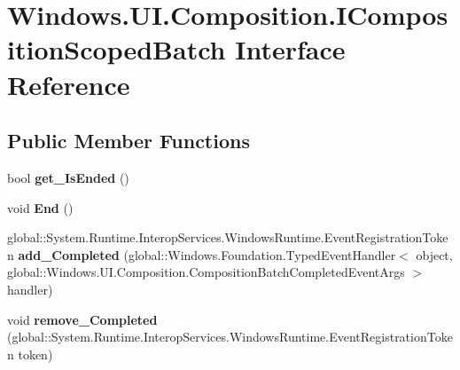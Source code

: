 \hypertarget{interface_windows_1_1_u_i_1_1_composition_1_1_i_composition_scoped_batch}{}\section{Windows.\+U\+I.\+Composition.\+I\+Composition\+Scoped\+Batch Interface Reference}
\label{interface_windows_1_1_u_i_1_1_composition_1_1_i_composition_scoped_batch}
\subsection*{Public Member Functions}
\begin{DoxyCompactItemize}
\item 
\mbox{\label{interface_windows_1_1_u_i_1_1_composition_1_1_i_composition_scoped_batch_a69a6c393c83900c6a83bce1ebc34c667}} 
bool {\bfseries get\+\_\+\+Is\+Ended} ()
\item 
\mbox{\label{interface_windows_1_1_u_i_1_1_composition_1_1_i_composition_scoped_batch_a6a716664cb94b74043a3dfc0119abd68}} 
void {\bfseries End} ()
\item 
\mbox{\label{interface_windows_1_1_u_i_1_1_composition_1_1_i_composition_scoped_batch_a8e6184255ede7485bdb1fd90fdc9b59c}} 
global\+::\+System.\+Runtime.\+Interop\+Services.\+Windows\+Runtime.\+Event\+Registration\+Token {\bfseries add\+\_\+\+Completed} (global\+::\+Windows.\+Foundation.\+Typed\+Event\+Handler$<$ object, global\+::\+Windows.\+U\+I.\+Composition.\+Composition\+Batch\+Completed\+Event\+Args $>$ handler)
\item 
\mbox{\label{interface_windows_1_1_u_i_1_1_composition_1_1_i_composition_scoped_batch_af4baa58c0bffd46f656f3fd7c4b1fdca}} 
void {\bfseries remove\+\_\+\+Completed} (global\+::\+System.\+Runtime.\+Interop\+Services.\+Windows\+Runtime.\+Event\+Registration\+Token token)
\item 
\mbox{\label{interface_windows_1_1_u_i_1_1_composition_1_1_i_composition_scoped_batch_a69a6c393c83900c6a83bce1ebc34c667}} 

\end{DoxyCompactItemize}
